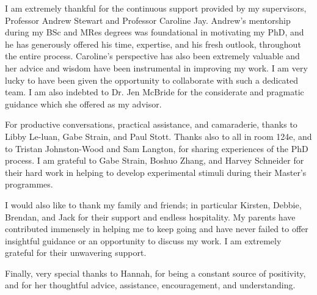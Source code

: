 I am extremely thankful for the continuous support provided by my supervisors, Professor Andrew Stewart and Professor Caroline Jay. Andrew’s mentorship during my BSc and MRes degrees was foundational in motivating my PhD, and he has generously offered his time, expertise, and his fresh outlook, throughout the entire process. Caroline's perspective has also been extremely valuable and her advice and wisdom have been instrumental in improving my work. I am very lucky to have been given the opportunity to collaborate with such a dedicated team. I am also indebted to Dr. Jen McBride for the considerate and pragmatic guidance which she offered as my advisor.

For productive conversations, practical assistance, and camaraderie, thanks to Libby Le-luan, Gabe Strain, and Paul Stott. Thanks also to all in room 124e, and to Tristan Johnston-Wood and Sam Langton, for sharing experiences of the PhD process. I am grateful to Gabe Strain, Boshuo Zhang, and Harvey Schneider for their hard work in helping to develop experimental stimuli during their Master’s programmes.

I would also like to thank my family and friends; in particular Kirsten, Debbie, Brendan, and Jack for their support and endless hospitality. My parents have contributed immensely in helping me to keep going and have never failed to offer insightful guidance or an opportunity to discuss my work. I am extremely grateful for their unwavering support.

Finally, very special thanks to Hannah, for being a constant source of positivity, and for her thoughtful advice, assistance, encouragement, and understanding.